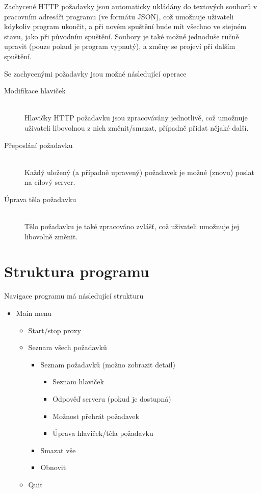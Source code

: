 \documentclass{article}
\begin{document}
Zachycené HTTP požadavky jsou automaticky ukládány do textových souborů v pracovním adresáři programu (ve formátu JSON), což umožnuje uživateli kdykoliv program ukončit, a při novém spuštění bude mít všechno ve stejném stavu, jako při původním spuštění. Soubory je také možné jednoduše ručně upravit (pouze pokud je program vypnutý), a změny se projeví při dalším spuštění.

Se zachycenými požadavky jsou možné následující operace

\begin{description}
	\item[Modifikace hlaviček] \hfill \\
		Hlavičky HTTP požadavku jsou zpracovávány jednotlivě, což umožnuje uživateli libovolnou z nich změnit/smazat, případně přidat nějaké další.
	\item[Přeposlání požadavku] \hfill \\
		Každý uložený (a případně upravený) požadavek je možné (znovu) poslat na cílový server.
	\item[Úprava těla požadavku] \hfill \\
		Tělo požadavku je také zpracováno zvlášť, což uživateli umožnuje jej libovolně změnit.
\end{description}

\section{Struktura programu}

Navigace programu má následující strukturu

\begin{itemize}
	\item Main menu
	\begin{itemize}
		\item Start/stop proxy
		\item Seznam všech požadavků
		\begin{itemize}
			\item Seznam požadavků (možno zobrazit detail)
			\begin{itemize}
				\item Seznam hlaviček
				\item Odpověď serveru (pokud je dostupná)
				\item Možnost přehrát požadavek
				\item Úprava hlaviček/těla požadavku
			\end{itemize}
			\item Smazat vše
			\item Obnovit
		\end{itemize}
		\item Quit
	\end{itemize}
\end{itemize}
\end{document}
